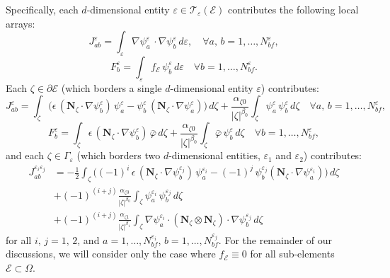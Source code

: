 	Specifically, each $d$-dimensional entity $\varepsilon \in \mathcal{T}_\varepsilon (\mathcal{E})$ contributes the following local arrays:
	\begin{equation}
			J^{\varepsilon}_{ab} = \int_{\varepsilon} \nabla \psi^{\varepsilon}_{a} \, \cdot \nabla \psi^{\varepsilon}_{b} \, d \varepsilon, \quad \forall a, \, b = 1, \ldots, N^{\varepsilon}_{bf},
	\end{equation}
	\begin{equation}
			F^{\varepsilon}_b = \int_{\varepsilon} f_{\mathcal{E}} \, \psi_b^{\varepsilon} \, d \varepsilon \quad \forall b = 1, \ldots, N^{\varepsilon}_{bf}.
	\end{equation}
	Each $\zeta \in \partial \mathcal{E}$ (which borders a single $d$-dimensional entity $\varepsilon$) contributes:
	\begin{equation}
			J^{\varepsilon}_{ab} = \int_{\zeta} \bigg( \epsilon \, (\mathbf{N}_{\zeta} \cdot \nabla \psi^{\varepsilon}_b) \, \psi^{\varepsilon}_a - \psi^{\varepsilon}_b \, (\mathbf{N}_{\zeta} \cdot \nabla \psi^{\varepsilon}_a) \bigg) \, d \zeta + \frac{\alpha_{\zeta0}}{|\zeta|^{\beta_0}} \int_{\zeta} \psi_a^{\varepsilon} \, \psi_b^{\varepsilon} \, d \zeta \quad \forall a, \, b = 1, \ldots, N^{\varepsilon}_{bf},
	\end{equation}
	\begin{equation}
		F^{\varepsilon}_b = \int_{\zeta} \epsilon \, (\mathbf{N}_{\zeta} \cdot \nabla \psi_b^{\varepsilon}) \, \bar{\varphi} \, d \zeta + \frac{\alpha_{\zeta0}}{|\zeta|^{\beta_0}} \int_{\zeta} \bar{\varphi} \, \psi_b^{\varepsilon} \, d \zeta \quad \forall b = 1, \ldots, N^{\varepsilon}_{bf},
		\label{eq:boundary_term}
	\end{equation}
	and each $\zeta \in \Gamma_\varepsilon$ (which borders two $d$-dimensional entities, $\varepsilon_1$ and $\varepsilon_2$) contributes:
	\begin{align}
			J^{\varepsilon_i \varepsilon_j}_{ab} & = - \frac{1}{2} \int_{\zeta} \bigg( (-1)^{i} \, \epsilon \, (\mathbf{N}_{\zeta} \cdot \nabla \psi_b^{\varepsilon_j}) \, \psi_a^{\varepsilon_i} - (-1)^{j} \, \psi_b^{\varepsilon_j} (\mathbf{N}_{\zeta} \cdot \nabla \psi_a^{\varepsilon_i}) \bigg) \, d \zeta \\
			& + (-1)^{(i+j)} \frac{\alpha_{\zeta0}}{|\zeta|^{\beta_0}} \int_{\zeta} \psi_a^{\varepsilon_i} \, \psi_b^{\varepsilon_j} \, d \zeta \\
			& + (-1)^{(i+j)} \frac{\alpha_{\zeta1}}{|\zeta|^{\beta_1}} \int_{\zeta} \nabla \psi_a^{\varepsilon_i} \cdot (\mathbf{N}_\zeta \otimes \mathbf{N}_\zeta) \cdot \nabla \psi_b^{\varepsilon_j} \, d \zeta
	\end{align}
	for all $i, \, j = 1, \, 2$, and $a = 1, \ldots, N^{\varepsilon_i}_{bf}$, $b = 1, \ldots, N^{\varepsilon_j}_{bf}$. For the remainder of our discussions, we will consider only the case where $f_\mathcal{E} \equiv 0$ for all sub-elements $\mathcal{E} \subset \Omega$.
	
